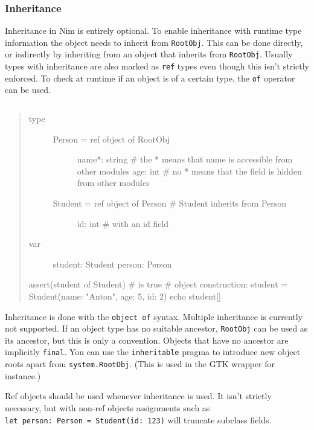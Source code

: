 \hypertarget{inheritance}{%
\subsubsection{Inheritance}\label{inheritance}}

Inheritance in Nim is entirely optional. To enable inheritance with
runtime type information the object needs to inherit from
\texttt{RootObj}. This can be done directly, or indirectly by inheriting
from an object that inherits from \texttt{RootObj}. Usually types with
inheritance are also marked as \texttt{ref} types even though this isn't
strictly enforced. To check at runtime if an object is of a certain
type, the \texttt{of} operator can be used.

\begin{verbatim}
\end{verbatim}

\begin{quote}
\begin{description}
\item[type]
\begin{description}
\item[Person = ref object of RootObj]
name*: string \# the * means that {name} is accessible from other
modules age: int \# no * means that the field is hidden from other
modules
\item[Student = ref object of Person \# Student inherits from Person]
id: int \# with an id field
\end{description}
\item[var]
student: Student person: Person
\end{description}

assert(student of Student) \# is true \# object construction: student =
Student(name: "Anton", age: 5, id: 2) echo student{[}{]}
\end{quote}

Inheritance is done with the \texttt{object\ of} syntax. Multiple
inheritance is currently not supported. If an object type has no
suitable ancestor, \texttt{RootObj} can be used as its ancestor, but
this is only a convention. Objects that have no ancestor are implicitly
\texttt{final}. You can use the \texttt{inheritable} pragma to introduce
new object roots apart from \texttt{system.RootObj}. (This is used in
the GTK wrapper for instance.)

Ref objects should be used whenever inheritance is used. It isn't
strictly necessary, but with non-ref objects assignments such as
\texttt{let\ person:\ Person\ =\ Student(id:\ 123)} will truncate
subclass fields.

